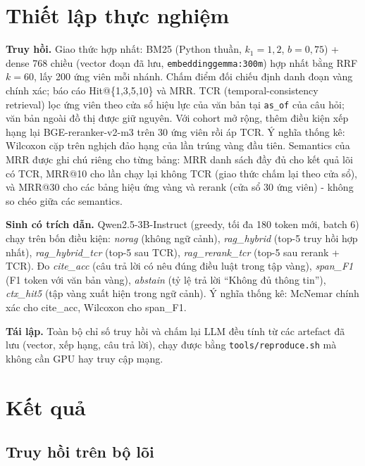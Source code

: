 \documentclass[11pt,a4paper]{article}
\begin{document}
\section{Thiết lập thực nghiệm}

\textbf{Truy hồi.} Giao thức hợp nhất: BM25 (Python thuần, $k_1{=}1{,}2$, $b{=}0{,}75$) + dense 768 chiều (vector đoạn đã lưu, \texttt{embeddinggemma:300m}) hợp nhất bằng RRF $k{=}60$, lấy 200 ứng viên mỗi nhánh. Chấm điểm đối chiếu định danh đoạn vàng chính xác; báo cáo Hit@\{1,3,5,10\} và MRR. TCR (temporal-consistency retrieval) lọc ứng viên theo cửa sổ hiệu lực của văn bản tại \texttt{as\_of} của câu hỏi; văn bản ngoài đồ thị được giữ nguyên. Với cohort mở rộng, thêm điều kiện xếp hạng lại BGE-reranker-v2-m3 trên 30 ứng viên rồi áp TCR. Ý nghĩa thống kê: Wilcoxon cặp trên nghịch đảo hạng của lần trúng vàng đầu tiên. Semantics của MRR được ghi chú riêng cho từng bảng: MRR danh sách đầy đủ cho kết quả lõi có TCR, MRR@10 cho lần chạy lại không TCR (giao thức chấm lại theo cửa sổ), và MRR@30 cho các bảng hiệu ứng vàng và rerank (cửa sổ 30 ứng viên) - không so chéo giữa các semantics.

\textbf{Sinh có trích dẫn.} Qwen2.5-3B-Instruct (greedy, tối đa 180 token mới, batch 6) chạy trên bốn điều kiện: \emph{norag} (không ngữ cảnh), \emph{rag\_hybrid} (top-5 truy hồi hợp nhất), \emph{rag\_hybrid\_tcr} (top-5 sau TCR), \emph{rag\_rerank\_tcr} (top-5 sau rerank + TCR). Đo \emph{cite\_acc} (câu trả lời có nêu đúng điều luật trong tập vàng), \emph{span\_F1} (F1 token với văn bản vàng), \emph{abstain} (tỷ lệ trả lời ``Không đủ thông tin''), \emph{ctx\_hit5} (tập vàng xuất hiện trong ngữ cảnh). Ý nghĩa thống kê: McNemar chính xác cho cite\_acc, Wilcoxon cho span\_F1.

\textbf{Tái lập.} Toàn bộ chỉ số truy hồi và chấm lại LLM đều tính từ các artefact đã lưu (vector, xếp hạng, câu trả lời), chạy được bằng \texttt{tools/reproduce.sh} mà không cần GPU hay truy cập mạng.

\section{Kết quả}

\subsection{Truy hồi trên bộ lõi}
\end{document}
